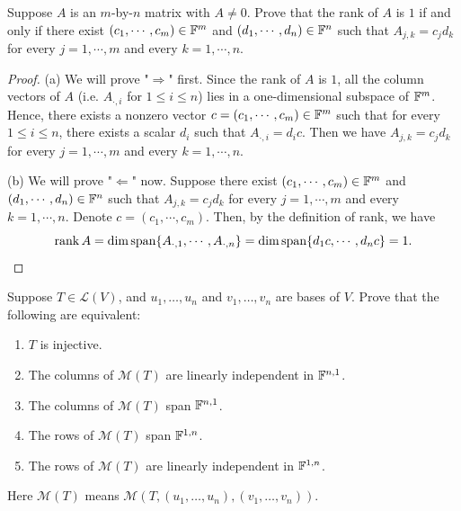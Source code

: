 \documentclass{article}
\begin{document}
\begin{problem}[3C-16]
    Suppose \( A \) is an \(m\)-by-\(n\) matrix with \( A\ne 0 \). Prove that the rank of \( A \)
    is \(1\) if and only if there exist \( (c_1,\cdots,c_m)\in\mathbb{F}^m \) and
    \( (d_1,\cdots,d_n)\in\mathbb{F}^n \) such that \( A_{j,k}=c_j d_k \) for every
    \( j=1,\cdots,m \) and every \( k=1,\cdots,n \).
\end{problem}

\begin{proof}
    (a) We will prove "\( \Rightarrow \)" first. Since the rank of \( A \) is \( 1 \), all the column vectors of \( A \) (i.e. \( A_{\cdot,i} \) for \( 1\le i\le n \)) lies in a one-dimensional subspace of \( \mathbb{F}^m \). Hence, there exists a nonzero vector \( c=(c_1,\cdots,c_m)\in\mathbb{F}^m \) such that for every \( 1\le i\le n \), there exists a scalar \( d_i \) such that \( A_{\cdot,i}=d_i c \). Then we have \( A_{j,k}=c_j d_k \) for every \( j=1,\cdots,m \) and every \( k=1,\cdots,n \). \par
    (b) We will prove "\( \Leftarrow \)" now. Suppose there exist \( (c_1,\cdots,c_m)\in\mathbb{F}^m \) and \( (d_1,\cdots,d_n)\in\mathbb{F}^n \) such that \( A_{j,k}=c_j d_k \) for every \( j=1,\cdots,m \) and every \( k=1,\cdots,n \). Denote \( c=(c_1,\cdots,c_m ) \). Then, by the definition of rank, we have
    \[ \operatorname{rank} A=\dim\operatorname{span}\{A_{\cdot,1},\cdots,A_{\cdot,n}\}=\dim\operatorname{span}\{d_1c,\cdots,d_nc\}=1. \]
\end{proof}

\begin{problem}[3C-17]
    Suppose \( T\in\mathcal{L}(V) \), and \( u_1,\ldots,u_n \) and \( v_1,\ldots,v_n \) are bases of \( V \). Prove that the following are equivalent:
    \begin{enumerate}[label=(\alph*)]
        \item \( T \) is injective.
        \item The columns of \( \mathcal{M}(T) \) are linearly independent in \( \mathbb{F}^{n,1} \).
        \item The columns of \( \mathcal{M}(T) \) span \( \mathbb{F}^{n,1} \).
        \item The rows of \( \mathcal{M}(T) \) span \( \mathbb{F}^{1,n} \).
        \item The rows of \( \mathcal{M}(T) \) are linearly independent in \( \mathbb{F}^{1,n} \).
    \end{enumerate}
    Here \( \mathcal{M}(T) \) means \( \mathcal{M}(T,(u_1,\ldots,u_n),(v_1,\ldots,v_n)) \).
\end{problem}
\end{document}
